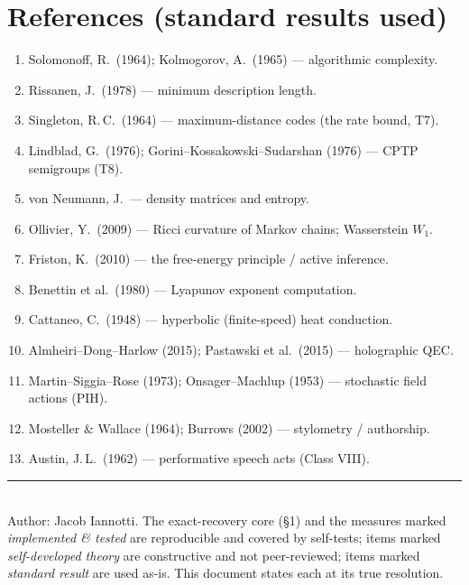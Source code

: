 \documentclass[11pt]{article}
\theoremstyle{definition}
\theoremstyle{plain}
\theoremstyle{remark}
\begin{document}
\section*{References (standard results used)}
\begin{enumerate}
\item Solomonoff, R.\ (1964); Kolmogorov, A.\ (1965) --- algorithmic complexity.
\item Rissanen, J.\ (1978) --- minimum description length.
\item Singleton, R.\,C.\ (1964) --- maximum-distance codes (the rate bound, T7).
\item Lindblad, G.\ (1976); Gorini--Kossakowski--Sudarshan (1976) --- CPTP semigroups (T8).
\item von Neumann, J.\ --- density matrices and entropy.
\item Ollivier, Y.\ (2009) --- Ricci curvature of Markov chains; Wasserstein $W_1$.
\item Friston, K.\ (2010) --- the free-energy principle / active inference.
\item Benettin et al.\ (1980) --- Lyapunov exponent computation.
\item Cattaneo, C.\ (1948) --- hyperbolic (finite-speed) heat conduction.
\item Almheiri--Dong--Harlow (2015); Pastawski et al.\ (2015) --- holographic QEC.
\item Martin--Siggia--Rose (1973); Onsager--Machlup (1953) --- stochastic field actions (PIH).
\item Mosteller \& Wallace (1964); Burrows (2002) --- stylometry / authorship.
\item Austin, J.\,L.\ (1962) --- performative speech acts (Class VIII).
\end{enumerate}

\vfill
\noindent\rule{\linewidth}{0.4pt}\\
{\small Author: Jacob Iannotti. The exact-recovery core (\S1) and the measures marked
\emph{implemented \& tested} are reproducible and covered by self-tests; items marked
\emph{self-developed theory} are constructive and not peer-reviewed; items marked
\emph{standard result} are used as-is. This document states each at its true resolution.}
\end{document}
